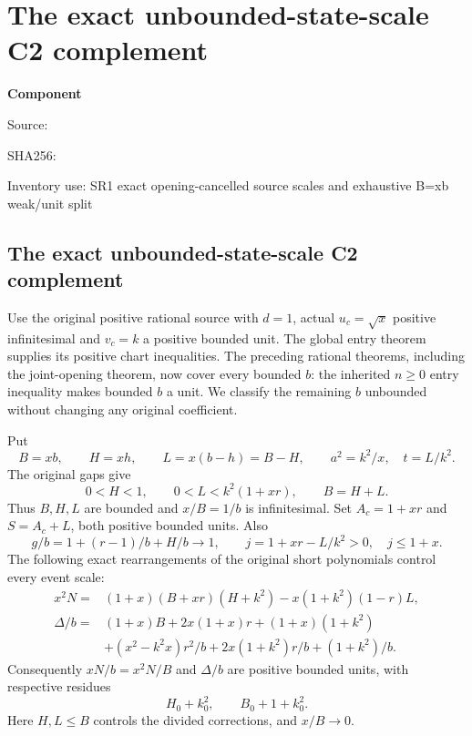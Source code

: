 \chapter{The exact unbounded-state-scale C2 complement}
\label{component:pb60046a37191}
\noindent\textbf{Component }\par
{\small\noindent Source: \par}
{\small\noindent SHA256: \par}
{\small\noindent Inventory use: SR1 exact opening-cancelled source scales and exhaustive B=xb weak/unit split\par}
\medskip
\section[The exact unbounded-state-scale C2 complement]{The exact unbounded-state-scale C2 complement}
\label{pb60046a37191:sec:c2-unbounded-b-reduction}

Use the original positive rational source with $d=1$, actual
$u_c=\sqrt x$ positive infinitesimal and $v_c=k$ a positive bounded
unit. The global entry theorem supplies its positive chart inequalities.
The preceding rational theorems, including the joint-opening theorem,
now cover every bounded $b$: the inherited $n\ge0$ entry inequality
makes bounded $b$ a unit. We classify the remaining $b$ unbounded
without changing any original coefficient.

Put
\[
 B=xb,\qquad H=xh,\qquad L=x(b-h)=B-H,\qquad
 a^2=k^2/x,\quad t=L/k^2.
\]
The original gaps give
\[
 0<H<1,\qquad0<L<k^2(1+xr),\qquad B=H+L.
\]
Thus $B,H,L$ are bounded and $x/B=1/b$ is infinitesimal.
Set $A_c=1+xr$ and $S=A_c+L$, both positive bounded units. Also
\[
 g/b=1+(r-1)/b+H/b\longrightarrow1,
 \qquad j=1+xr-L/k^2>0,\quad j\le1+x.
\]
The following exact rearrangements of the original short polynomials
control every event scale:
\begin{align*}
 x^2N={}&(1+x)(B+xr)(H+k^2)-x(1+k^2)(1-r)L,\\
 \Delta/b={}&(1+x)B+2x(1+x)r+(1+x)(1+k^2)\\
 &+(x^2-k^2x)r^2/b+2x(1+k^2)r/b+(1+k^2)/b.
\end{align*}
Consequently $xN/b=x^2N/B$ and $\Delta/b$ are positive bounded
units, with respective residues
\[
 H_0+k_0^2,\qquad B_0+1+k_0^2.
\]
Here $H,L\le B$ controls the divided corrections, and $x/B\to0$.

